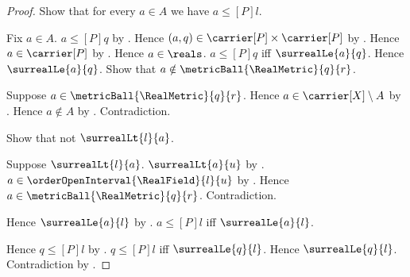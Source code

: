 \begin{proof}
    Show that for every $a\in A$ we have
        $a\mathrel{\leq[P]}l$.
    \begin{subproof}
        Fix $a\in A$.
        $a\mathrel{\leq[P]}q$ by
            .
        Hence $(a,q)\in\carrier[P]\times\carrier[P]$ by
            .
        Hence $a\in\carrier[P]$ by .
        Hence $a\in\reals$.
        $a\mathrel{\leq[P]}q$ iff $\surrealLe{a}{q}$.
        Hence $\surrealLe{a}{q}$.
        Show that $a\notin\metricBall{\RealMetric}{q}{r}$.
        \begin{subproof}
            Suppose $a\in\metricBall{\RealMetric}{q}{r}$.
            Hence $a\in\carrier[X]\setminus A$ by .
            Hence $a\notin A$ by .
            Contradiction.
        \end{subproof}
        Show that not $\surrealLt{l}{a}$.
        \begin{subproof}
            Suppose $\surrealLt{l}{a}$.
            $\surrealLt{a}{u}$ by
                .
            $a\in\orderOpenInterval{\RealField}{l}{u}$ by
                .
            Hence $a\in\metricBall{\RealMetric}{q}{r}$.
            Contradiction.
        \end{subproof}
        Hence $\surrealLe{a}{l}$ by
            .
        $a\mathrel{\leq[P]}l$ iff $\surrealLe{a}{l}$.
    \end{subproof}
    Hence $q\mathrel{\leq[P]}l$ by
        .
    $q\mathrel{\leq[P]}l$ iff $\surrealLe{q}{l}$.
    Hence $\surrealLe{q}{l}$.
    Contradiction by
        .
\end{proof}

